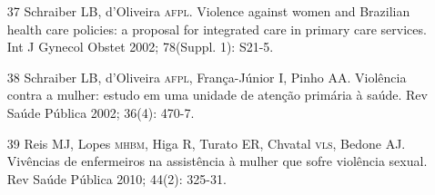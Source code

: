 \documentclass{article}
\begin{document}
\begin{itemize}
\item[37] Schraiber LB, d'Oliveira \textsc{afpl}. Violence against women and
Brazilian health care policies: a proposal for integrated care in primary care
services. Int J Gynecol Obstet 2002; 78(Suppl. 1): S21-5.

\item[38] Schraiber LB, d'Oliveira \textsc{afpl}, França-Júnior I, Pinho AA.
Violência contra a mulher: estudo em uma unidade de atenção primária à saúde.
Rev Saúde Pública 2002; 36(4): 470-7.

\item[39] Reis MJ, Lopes \textsc{mhbm}, Higa R, Turato ER, Chvatal \textsc{vls}, Bedone AJ.
Vivências de enfermeiros na assistência à mulher que sofre violência sexual. Rev
Saúde Pública 2010; 44(2): 325-31.

\end{itemize}
\end{document}
